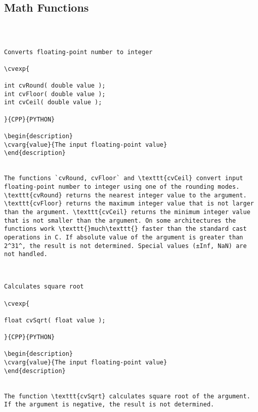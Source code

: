 \subsection{Math Functions}
\begin{verbatim}


\end{verbatim}
\label{Round, Floor, Ceil}
\begin{verbatim}

Converts floating-point number to integer

\cvexp{

int cvRound( double value );
int cvFloor( double value );
int cvCeil( double value );

}{CPP}{PYTHON}

\begin{description}
\cvarg{value}{The input floating-point value}
\end{description}


The functions `cvRound, cvFloor` and \texttt{cvCeil} convert input floating-point number to integer using one of the rounding modes. \texttt{cvRound} returns the nearest integer value to the argument. \texttt{cvFloor} returns the maximum integer value that is not larger than the argument. \texttt{cvCeil} returns the minimum integer value that is not smaller than the argument. On some architectures the functions work \texttt{}much\texttt{} faster than the standard cast operations in C. If absolute value of the argument is greater than 2^31^, the result is not determined. Special values (±Inf, NaN) are not handled.


\end{verbatim}
\label{Sqrt}
\begin{verbatim}

Calculates square root

\cvexp{

float cvSqrt( float value );

}{CPP}{PYTHON}

\begin{description}
\cvarg{value}{The input floating-point value}
\end{description}


The function \texttt{cvSqrt} calculates square root of the argument. If the argument is negative, the result is not determined.


\end{verbatim}
\label{InvSqrt}
